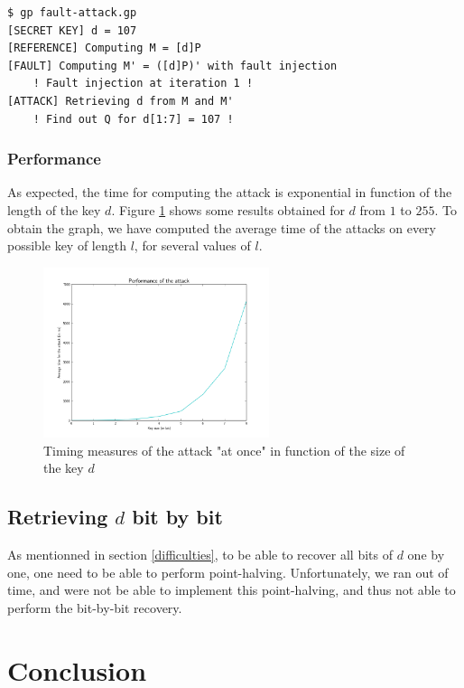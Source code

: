 \documentclass[journal]{IEEEtran}
\begin{document}
\begin{footnotesize}
\begin{verbatim}
$ gp fault-attack.gp 
[SECRET KEY] d = 107
[REFERENCE] Computing M = [d]P
[FAULT] Computing M' = ([d]P)' with fault injection
    ! Fault injection at iteration 1 !
[ATTACK] Retrieving d from M and M'
    ! Find out Q for d[1:7] = 107 !
\end{verbatim}
\end{footnotesize}

\subsubsection{Performance}
\label{perf-all}
As expected, the time for computing the attack is exponential in function of the length of the key $d$. Figure \ref{first-attack-perf} shows some results obtained for $d$ from $1$ to $255$. 
To obtain the graph, we have computed the average time of the attacks on every possible key of length $l$, for several values of $l$.

\begin{figure}
    \centering
    \includegraphics[width=250px]{img/first-attack-perf.png}
    \caption{Timing measures of the attack "at once" in function of the size of the key $d$}
    \label{first-attack-perf}
\end{figure}   


\subsection{Retrieving $d$ bit by bit}
As mentionned in section \ref{difficulties}, to be able to recover all bits of $d$ one by one, one need to be able to perform point-halving.
Unfortunately, we ran out of time, and were not be able to implement this point-halving, and thus not able to perform the bit-by-bit recovery.

\section{Conclusion}
\end{document}
